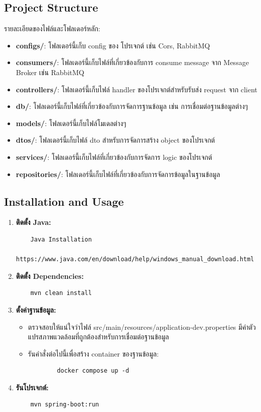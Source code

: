 \subsection{Project Structure}
รายละเอียดของไฟล์และโฟลเดอร์หลัก:
\begin{itemize}
    \item \textbf{configs/}: โฟลเดอร์นี้เก็บ config ของ โปรเจกต์ เช่น Cors, RabbitMQ
    \item \textbf{consumers/}: โฟลเดอร์นี้เก็บไฟล์ที่เกี่ยวข้องกับการ consume message จาก Message Broker เช่น RabbitMQ
    \item \textbf{controllers/}: โฟลเดอร์นี้เก็บไฟล์ handler ของโปรเจกต์สำหรับรับส่ง request จาก client
    \item \textbf{db/}: โฟลเดอร์นี้เก็บไฟล์ที่เกี่ยวข้องกับการจัดการฐานข้อมูล เช่น การเชื่อมต่อฐานข้อมูลต่างๆ
    \item \textbf{models/}: โฟลเดอร์นี้เก็บไฟล์โมเดลต่างๆ
    \item \textbf{dtos/}: โฟลเดอร์นี้เก็บไฟล์ dto สำหรับการจัดการสร้าง object ของโปรเจกต์
    \item \textbf{services/}: โฟลเดอร์นี้เก็บไฟล์ที่เกี่ยวข้องกับการจัดการ logic ของโปรเจกต์
    \item \textbf{repositories/}: โฟลเดอร์นี้เก็บไฟล์ที่เกี่ยวข้องกับการจัดการข้อมูลในฐานข้อมูล
\end{itemize}

\subsection{Installation and Usage}
\begin{enumerate}
    \item \textbf{ติดตั้ง Java:}
    \begin{verbatim}
    Java Installation 
    https://www.java.com/en/download/help/windows_manual_download.html
    \end{verbatim}
    \item \textbf{ติดตั้ง Dependencies:}
    \begin{verbatim}
    mvn clean install
    \end{verbatim}
    \item \textbf{ตั้งค่าฐานข้อมูล:}
    \begin{itemize}
        \item ตรวจสอบให้แน่ใจว่าไฟล์ src/main/resources/application-dev.properties มีค่าตัวแปรสภาพแวดล้อมที่ถูกต้องสำหรับการเชื่อมต่อฐานข้อมูล
        \item รันคำสั่งต่อไปนี้เพื่อสร้าง container ของฐานข้อมูล:
        \begin{verbatim}
        docker compose up -d
        \end{verbatim}
    \end{itemize}
    \item \textbf{รันโปรเจกต์:}
    \begin{verbatim}
    mvn spring-boot:run
    \end{verbatim}
\end{enumerate}

